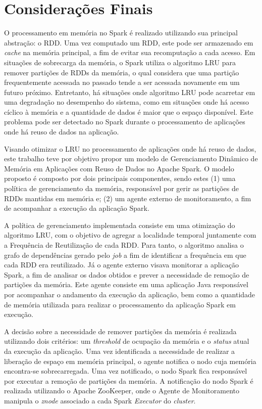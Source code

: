 \chapter{Considerações Finais} \label{cap:consideracoes-finais}
O processamento em memória no Spark é realizado utilizando sua principal abstração: o RDD. Uma vez computado um RDD, este pode ser armazenado em \textit{cache} na memória principal, a fim de evitar sua recomputação a cada acesso. Em situações de sobrecarga da memória, o Spark utiliza o algoritmo LRU para remover partições de RDDs da memória, o qual considera que uma partição frequentemente acessada no passado tende a ser acessada novamente em um futuro próximo. Entretanto, há situações onde algoritmo LRU pode acarretar em uma degradação no desempenho do sistema, como em situações onde há acesso cíclico à memória e a quantidade de dados é maior que o espaço disponível. Este problema pode ser detectado no Spark durante o processamento de aplicações onde há reuso de dados na aplicação.

Visando otimizar o LRU no processamento de aplicações onde há reuso de dados,  este trabalho teve por objetivo propor um modelo de Gerenciamento Dinâmico de Memória em Aplicações com Reuso de Dados no Apache Spark. O modelo proposto é composto por dois principais componentes, sendo estes (1) uma política de gerenciamento da memória, responsável por gerir as partições de RDDs mantidas em memória e; (2) um agente externo de monitoramento, a fim de acompanhar a execução da aplicação Spark.

A política de gerenciamento implementada consiste em uma otimização do algoritmo LRU, com o objetivo de agregar a localidade temporal juntamente com a Frequência de Reutilização de cada RDD. Para tanto, o algoritmo analisa o grafo de dependências gerado pelo \textit{job} a fim de identificar a frequência em que cada RDD era reutilizado. Já o agente externo visava monitorar a aplicação Spark, a fim de analisar os dados obtidos e prever a necessidade de remoção de partições da memória. Este agente consiste em uma aplicação Java responsável por acompanhar o andamento da execução da aplicação, bem como a quantidade de memória utilizada para realizar o processamento da aplicação Spark em execução. 

A decisão sobre a necessidade de remover partições da memória é realizada utilizando dois critérios: um \textit{threshold} de ocupação da memória e o \textit{status} atual da execução da aplicação. Uma vez identificada a necessidade de realizar a liberação de espaço em memória principal, o agente notifica o nodo cuja memória encontra-se sobrecarregada. Uma vez notificado, o nodo Spark fica responsável por executar a remoção de partições da memória. A notificação do nodo Spark é realizada utilizando o Apache ZooKeeper, onde o Agente de Monitoramento manipula o \textit{znode} associado a cada Spark \textit{Executor} do \textit{cluster}.

